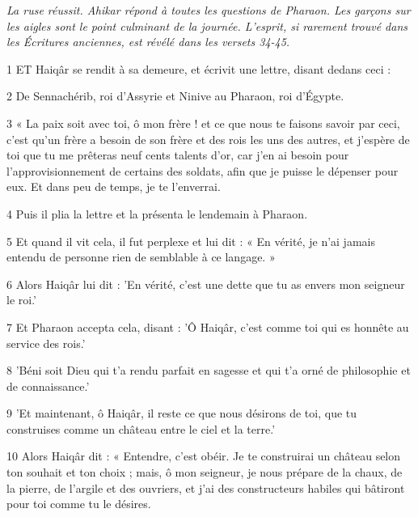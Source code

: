 \par \textit{La ruse réussit. Ahikar répond à toutes les questions de Pharaon. Les garçons sur les aigles sont le point culminant de la journée. L'esprit, si rarement trouvé dans les Écritures anciennes, est révélé dans les versets 34-45.}

\par 1 ET Haiqâr se rendit à sa demeure, et écrivit une lettre, disant dedans ceci :

\par 2 De Sennachérib, roi d'Assyrie et Ninive au Pharaon, roi d'Égypte.

\par 3 « La paix soit avec toi, ô mon frère ! et ce que nous te faisons savoir par ceci, c'est qu'un frère a besoin de son frère et des rois les uns des autres, et j'espère de toi que tu me prêteras neuf cents talents d'or, car j'en ai besoin pour l'approvisionnement de certains des soldats, afin que je puisse le dépenser pour eux. Et dans peu de temps, je te l'enverrai.

\par 4 Puis il plia la lettre et la présenta le lendemain à Pharaon.

\par 5 Et quand il vit cela, il fut perplexe et lui dit : « En vérité, je n'ai jamais entendu de personne rien de semblable à ce langage. »

\par 6 Alors Haiqâr lui dit : 'En vérité, c'est une dette que tu as envers mon seigneur le roi.'

\par 7 Et Pharaon accepta cela, disant : 'Ô Haiqâr, c'est comme toi qui es honnête au service des rois.'

\par 8 'Béni soit Dieu qui t'a rendu parfait en sagesse et qui t'a orné de philosophie et de connaissance.'

\par 9 'Et maintenant, ô Haiqâr, il reste ce que nous désirons de toi, que tu construises comme un château entre le ciel et la terre.'

\par 10 Alors Haiqâr dit : « Entendre, c'est obéir. Je te construirai un château selon ton souhait et ton choix ; mais, ô mon seigneur, je nous prépare de la chaux, de la pierre, de l'argile et des ouvriers, et j'ai des constructeurs habiles qui bâtiront pour toi comme tu le désires.

